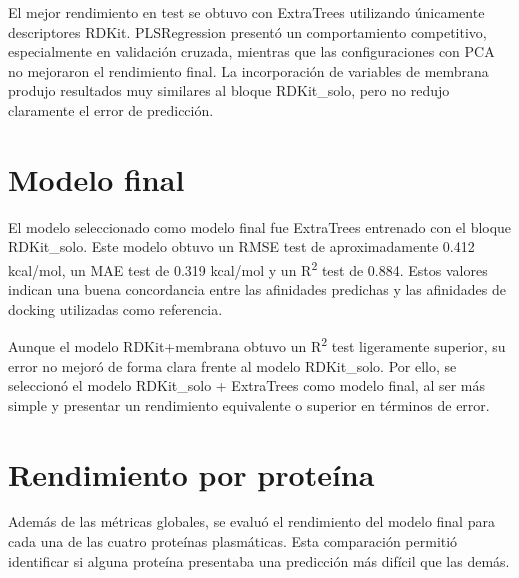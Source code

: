 \documentclass[
  spanish,
  a4paper,
  12pt,
  oneside,
  openany]{memoir}
\begin{document}
El mejor rendimiento en test se obtuvo con ExtraTrees utilizando
únicamente descriptores RDKit. PLSRegression presentó un comportamiento
competitivo, especialmente en validación cruzada, mientras que las
configuraciones con PCA no mejoraron el rendimiento final. La
incorporación de variables de membrana produjo resultados muy similares
al bloque RDKit\_solo, pero no redujo claramente el error de predicción.

\section{Modelo final}

El modelo seleccionado como modelo final fue ExtraTrees entrenado con el
bloque RDKit\_solo. Este modelo obtuvo un RMSE test de aproximadamente
0.412 kcal/mol, un MAE test de 0.319 kcal/mol y un R\textsuperscript{2}
test de 0.884. Estos valores indican una buena concordancia entre las
afinidades predichas y las afinidades de docking utilizadas como
referencia.

\begin{table}

\caption{\label{tbl-modelo-final}Resumen del modelo final seleccionado.}


\end{table}%

Aunque el modelo RDKit+membrana obtuvo un R\textsuperscript{2} test
ligeramente superior, su error no mejoró de forma clara frente al modelo
RDKit\_solo. Por ello, se seleccionó el modelo RDKit\_solo + ExtraTrees
como modelo final, al ser más simple y presentar un rendimiento
equivalente o superior en términos de error.

\section{Rendimiento por proteína}

Además de las métricas globales, se evaluó el rendimiento del modelo
final para cada una de las cuatro proteínas plasmáticas. Esta
comparación permitió identificar si alguna proteína presentaba una
predicción más difícil que las demás.
\end{document}

